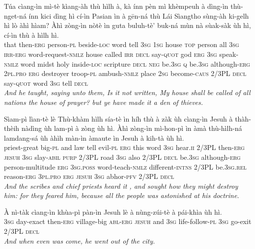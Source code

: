 \documentclass[11pt,a4paper]{article}
\begin{document}
\begin{exe}
\gll Túa cìang-ìn mì-tè kìang-àh thù hìlh à, kà ínn pèn mì khèmpeuh à dìng-ìn thù-nget-ná ínn kici dìng hì cí-ìn Pasian ìn à gēn-ná thù Lái Sìangtho sùng-àh ki-gelh hì lò àhì hìam? Àhì zòng-ìn nòtè ìn guta buluh-tè' buk-ná mùn nà sùak-sàk ùh hì, cí-ìn thù à hìlh hì. \\
     that then-\textsc{erg} person-\textsc{pl} beside-\textsc{loc} word tell \textsc{3sg} \textsc{1sg} house \textsc{top} person all \textsc{3sg} \textsc{irr}-\textsc{erg} word-request-\textsc{nmlz} house called \textsc{irr} \textsc{decl} say-\textsc{quot} god \textsc{erg} \textsc{3sg} speak-\textsc{nmlz} word midst holy inside-\textsc{loc} scripture \textsc{decl} \textsc{neg} be.\textsc{3sg} \textsc{q} be.\textsc{3sg} although-\textsc{erg} \textsc{2pl}.\textsc{pro} \textsc{erg} destroyer troop-\textsc{pl} ambush-\textsc{nmlz} place \textsc{2sg} become-\textsc{caus} 2/3PL \textsc{decl} say-\textsc{quot} word \textsc{3sg} tell \textsc{decl} \\
\glt \textcolor{kjvcolor}{\textit{And he taught, saying unto them, Is it not written, My house shall be called of all nations the house of prayer? but ye have made it a den of thieves.}}

\gll Sìam-pì lìan-tè lè Thù-khàm hìlh sía-tè ìn híh thù à zàk ùh cìang-ìn Jesuh à thàh-thèih nàdìng ùh lam-pì à zòng ùh hì. Àhì zòng-ìn mì-hon-pì ìn àmà thù-hìlh-ná lamdang-sá ùh àhìh màn-ìn àmaute ìn Jesuh à kih-tà ùh hì. \\
     priest-great big-\textsc{pl} and law tell evil-\textsc{pl} \textsc{erg} this word \textsc{3sg} hear.\textsc{ii} 2/3PL then-\textsc{erg} \textsc{jesuh} \textsc{3sg} slay-\textsc{abil} \textsc{purp} 2/3PL road \textsc{3sg} also 2/3PL \textsc{decl} be.\textsc{3sg} although-\textsc{erg} person-multitude \textsc{erg} \textsc{3sg}.\textsc{poss} word-teach-\textsc{nmlz} different-\textsc{intns} 2/3PL be.\textsc{3sg}.\textsc{rel} reason-\textsc{erg} \textsc{3pl}.\textsc{pro} \textsc{erg} \textsc{jesuh} \textsc{3sg} abhor-\textsc{pfv} 2/3PL \textsc{decl} \\
\glt \textcolor{kjvcolor}{\textit{And the scribes and chief priests heard it , and sought how they might destroy him: for they feared him, because all the people was astonished at his doctrine.}}

\gll À nì-tàk cìang-ìn khùa-pì pàn-ìn Jesuh lè à nùng-zúi-tè à pái-khìa ùh hì. \\
     \textsc{3sg} day-exact then-\textsc{erg} village-big \textsc{abl}-\textsc{erg} \textsc{jesuh} and \textsc{3sg} life-follow-\textsc{pl} \textsc{3sg} go-exit 2/3PL \textsc{decl} \\
\glt \textcolor{kjvcolor}{\textit{And when even was come, he went out of the city.}}


\end{exe}
\end{document}
